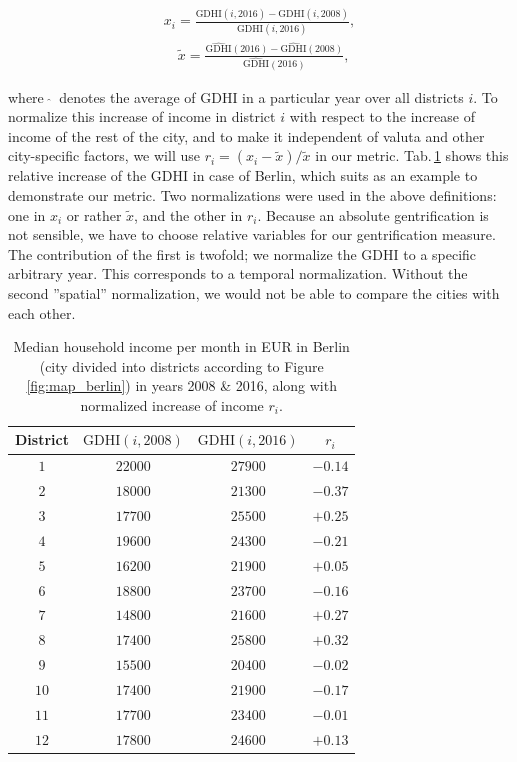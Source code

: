 \documentclass[a4paper, 10pt, conference]{ieeeconf}      %
\providecommand{\tabularnewline}{\\}
\begin{document}
\begin{equation}
\begin{split}
x_{i}=\frac{\mathrm{GDHI}(i,2016)-\mathrm{GDHI}(i,2008)}{\mathrm{GDHI}(i,2016)}, \\
\quad\tilde{x}=\frac{\widehat{\mathrm{GDHI}}(2016)-\widehat{\mathrm{GDHI}}(2008)}{\widehat{\mathrm{GDHI}}(2016)},
\end{split}
\label{eq:gdhi}
\end{equation}

where $\ \widehat{}\ $ denotes the average of GDHI in a particular year over all districts $i$. To normalize this increase of income
in district $i$ with respect to the increase of income of the rest of the city, and to make it independent of valuta and other city-specific
factors, we will use $r_{i}=\left(x_{i}-\tilde{x}\right)/\tilde{x}$ in our metric. Tab.$\,$\ref{tab:Median-household-income} shows this relative
increase of the GDHI in case of Berlin, which suits as an example to demonstrate our metric. Two normalizations were used in the above definitions: 
one in $x_{i}$ or rather $\tilde{x}$, and the other in $r_{i}$.
Because an absolute gentrification is not sensible, we have to choose relative variables for our gentrification measure. 
The contribution of the first is twofold; we normalize the GDHI to a specific arbitrary year. This corresponds to a temporal 
normalization. Without the second ''spatial'' normalization, we would not be able to compare the cities with each other. 

\begin{table}[h]
	\begin{centering}
		\begin{tabular}{|c|c|c|c|}
			\hline 
			District & $\mathrm{GDHI}(i,2008)$ & $\mathrm{GDHI}(i,2016)$ & $r_{i}$ \tabularnewline
			\hline 
			\hline 
			$1$ & $22000$ & $27900$ & $-0.14$\tabularnewline
			\hline 
			$2$ & $18000$ & $21300$ & $-0.37$\tabularnewline
			\hline 
			$3$ & $17700$ & $25500$ & $+0.25$\tabularnewline
			\hline 
			$4$ & $19600$ & $24300$ & $-0.21$\tabularnewline
			\hline  
			$5$ & $16200$ & $21900$ & $+0.05$\tabularnewline
			\hline 
			$6$ & $18800$ & $23700$ & $-0.16$\tabularnewline
			\hline 
			$7$ & $14800$ & $21600$ & $+0.27$\tabularnewline
			\hline 
			$8$ & $17400$ & $25800$ & $+0.32$\tabularnewline
			\hline 
			$9$ & $15500$ & $20400$ & $-0.02$\tabularnewline
			\hline 
			$10$ & $17400$ & $21900$ & $-0.17$\tabularnewline
			\hline 
			$11$ & $17700$ & $23400$ & $-0.01$\tabularnewline
			\hline 
			$12$ & $17800$ & $24600$ & $+0.13$\tabularnewline
			\hline 
		\end{tabular}
		\par\end{centering}
	
	\caption{Median household income per month in EUR in Berlin (city divided into
		districts according to Figure \ref{fig:map_berlin}) in years
		2008 \& 2016, along with normalized increase of income $r_i$.}
		\label{tab:Median-household-income}
\end{table}
\end{document}
